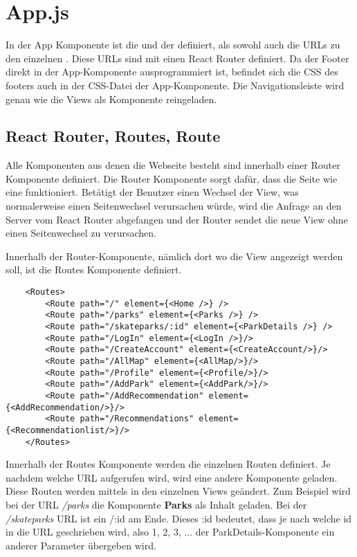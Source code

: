\section{App.js}
\label{appDatei}

In der App Komponente ist die  und der  definiert, 
als sowohl auch die URLs zu den einzelnen . Diese URLs sind mit einen React 
Router definiert. Da der Footer direkt in der App-Komponente ausprogrammiert ist, 
befindet sich die CSS des footers auch in der CSS-Datei der App-Komponente. Die Navigationsleiste wird genau 
wie die Views als Komponente reingeladen.

\subsection{React Router, Routes, Route}
Alle Komponenten aus denen die Webseite besteht sind innerhalb einer Router Komponente definiert. Die 
Router Komponente sorgt dafür, dass die Seite wie eine  funktioniert. Betätigt
der Benutzer einen Wechsel der View, was normalerweise einen Seitenwechsel verursachen würde, wird die 
Anfrage an den Server vom React Router abgefangen und der Router sendet die neue View ohne einen 
Seitenwechsel zu verursachen. 


Innerhalb der Router-Komponente, nämlich dort wo die View angezeigt werden soll, ist die Routes
Komponente definiert.
\begin{lstlisting}
    <Routes>
        <Route path="/" element={<Home />} />
        <Route path="/parks" element={<Parks />} />
        <Route path="/skateparks/:id" element={<ParkDetails />} />
        <Route path="/LogIn" element={<LogIn />}/>
        <Route path="/CreateAccount" element={<CreateAccount/>}/>
        <Route path="/AllMap" element={<AllMap/>}/>
        <Route path="/Profile" element={<Profile/>}/>
        <Route path="/AddPark" element={<AddPark/>}/>
        <Route path="/AddRecommendation" element={<AddRecommendation/>}/>
        <Route path="/Recommendations" element={<Recommendationlist/>}/>
    </Routes>
\end{lstlisting} 
Innerhalb der Routes Komponente werden die einzelnen Routen definiert. Je nachdem welche URL aufgerufen wird,
wird eine andere Komponente geladen. Diese Routen werden mittels  in den einzelnen 
Views geändert. Zum Beispiel wird bei der URL \textit{/parks} die Komponente \textbf{Parks} als 
Inhalt geladen. Bei der \textit{/skateparks} URL ist ein /:id am Ende. Dieses :id 
bedeutet, dass je nach welche id in die URL geschrieben wird, also 1, 2, 3, ... der 
ParkDetails-Komponente ein anderer Parameter übergeben wird. 

